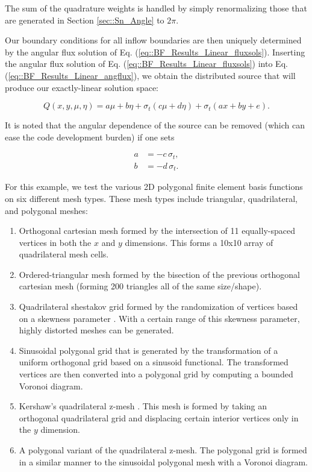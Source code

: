 \noindent The sum of the quadrature weights is handled by simply renormalizing those that are generated in Section \ref{sec::Sn_Angle} to $2 \pi$.

Our boundary conditions for all inflow boundaries are then uniquely determined by the angular flux solution of Eq. (\ref{eq::BF_Results_Linear_fluxsols}). Inserting the angular flux solution of Eq. (\ref{eq::BF_Results_Linear_fluxsols}) into Eq. (\ref{eq::BF_Results_Linear_angflux}), we obtain the distributed source that will produce our exactly-linear solution space:

\begin{equation}
\label{eq::BF_Results_Linear_src}
Q(x,y,\mu,\eta) = a \mu + b \eta + \sigma_t \left(  c \mu + d \eta \right) + \sigma_t \left( ax +by + e   \right).
\end{equation}

\noindent It is noted that the angular dependence of the source can be removed (which can ease the code development burden) if one sets

\begin{equation}
\label{eq::BF_Results_Linear_removeterms}
\begin{aligned}
	a &= - c \, \sigma_t, \\
	b &= - d \, \sigma_t.
\end{aligned}
\end{equation}

For this example, we test the various 2D polygonal finite element basis functions on six different mesh types. These mesh types include triangular, quadrilateral, and polygonal meshes:

\begin{enumerate}
	\item Orthogonal cartesian mesh formed by the intersection of 11 equally-spaced vertices in both the $x$ and $y$ dimensions. This forms a 10x10 array of quadrilateral mesh cells.
	\item Ordered-triangular mesh formed by the bisection of the previous orthogonal cartesian mesh (forming 200 triangles all of the same size/shape).
	\item Quadrilateral shestakov grid formed by the randomization of vertices based on a skewness parameter \cite{shestakov1988solution,shestakov1990test}. With a certain range of this skewness parameter, highly distorted meshes can be generated.
	\item Sinusoidal polygonal grid that is generated by the transformation of a uniform orthogonal grid based on a sinusoid functional. The transformed vertices are then converted into a polygonal grid by computing a bounded Voronoi diagram.
	\item Kershaw's quadrilateral z-mesh \cite{kershaw1981differencing}. This mesh is formed by taking an orthogonal quadrilateral grid and displacing certain interior vertices only in the $y$ dimension.
	\item A polygonal variant of the quadrilateral z-mesh. The polygonal grid is formed in a similar manner to the sinusoidal polygonal mesh with a Voronoi diagram.
\end{enumerate}

